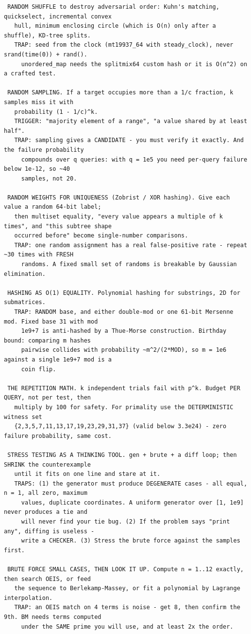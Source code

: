 \documentclass[9pt,a4paper,twocolumn]{extarticle}
\begin{document}
\begin{lstlisting}
 RANDOM SHUFFLE to destroy adversarial order: Kuhn's matching, quickselect, incremental convex
   hull, minimum enclosing circle (which is O(n) only after a shuffle), KD-tree splits.
   TRAP: seed from the clock (mt19937_64 with steady_clock), never srand(time(0)) + rand().
     unordered_map needs the splitmix64 custom hash or it is O(n^2) on a crafted test.

 RANDOM SAMPLING. If a target occupies more than a 1/c fraction, k samples miss it with
   probability (1 - 1/c)^k.
   TRIGGER: "majority element of a range", "a value shared by at least half".
   TRAP: sampling gives a CANDIDATE - you must verify it exactly. And the failure probability
     compounds over q queries: with q = 1e5 you need per-query failure below 1e-12, so ~40
     samples, not 20.

 RANDOM WEIGHTS FOR UNIQUENESS (Zobrist / XOR hashing). Give each value a random 64-bit label;
   then multiset equality, "every value appears a multiple of k times", and "this subtree shape
   occurred before" become single-number comparisons.
   TRAP: one random assignment has a real false-positive rate - repeat ~30 times with FRESH
     randoms. A fixed small set of randoms is breakable by Gaussian elimination.

 HASHING AS O(1) EQUALITY. Polynomial hashing for substrings, 2D for submatrices.
   TRAP: RANDOM base, and either double-mod or one 61-bit Mersenne mod. Fixed base 31 with mod
     1e9+7 is anti-hashed by a Thue-Morse construction. Birthday bound: comparing m hashes
     pairwise collides with probability ~m^2/(2*MOD), so m = 1e6 against a single 1e9+7 mod is a
     coin flip.

 THE REPETITION MATH. k independent trials fail with p^k. Budget PER QUERY, not per test, then
   multiply by 100 for safety. For primality use the DETERMINISTIC witness set
   {2,3,5,7,11,13,17,19,23,29,31,37} (valid below 3.3e24) - zero failure probability, same cost.

 STRESS TESTING AS A THINKING TOOL. gen + brute + a diff loop; then SHRINK the counterexample
   until it fits on one line and stare at it.
   TRAPS: (1) the generator must produce DEGENERATE cases - all equal, n = 1, all zero, maximum
     values, duplicate coordinates. A uniform generator over [1, 1e9] never produces a tie and
     will never find your tie bug. (2) If the problem says "print any", diffing is useless -
     write a CHECKER. (3) Stress the brute force against the samples first.

 BRUTE FORCE SMALL CASES, THEN LOOK IT UP. Compute n = 1..12 exactly, then search OEIS, or feed
   the sequence to Berlekamp-Massey, or fit a polynomial by Lagrange interpolation.
   TRAP: an OEIS match on 4 terms is noise - get 8, then confirm the 9th. BM needs terms computed
     under the SAME prime you will use, and at least 2x the order.


\end{lstlisting}
\end{document}
